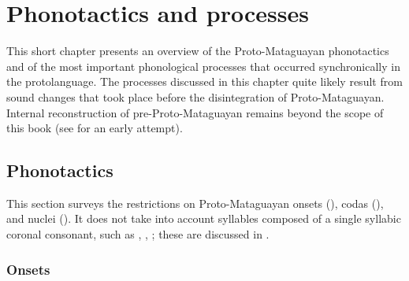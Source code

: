 \chapter{Phonotactics and processes} \label{pm-processes}

This short chapter presents an overview of the Proto-Mataguayan phonotactics and of the most important phonological processes that occurred synchronically in the protolanguage. The processes discussed in this chapter quite likely result from sound changes that took place before the disintegration of Proto-Mataguayan. Internal reconstruction of pre-Proto-Mataguayan remains beyond the scope of this book (see  for an early attempt).

\section{Phonotactics}

This section surveys the restrictions on Proto-Mataguayan onsets (), codas (), and nuclei (). It does not take into account syllables composed of a single syllabic coronal consonant, such as , , ; these are discussed in . 

\subsection{Onsets}\label{onsets}

